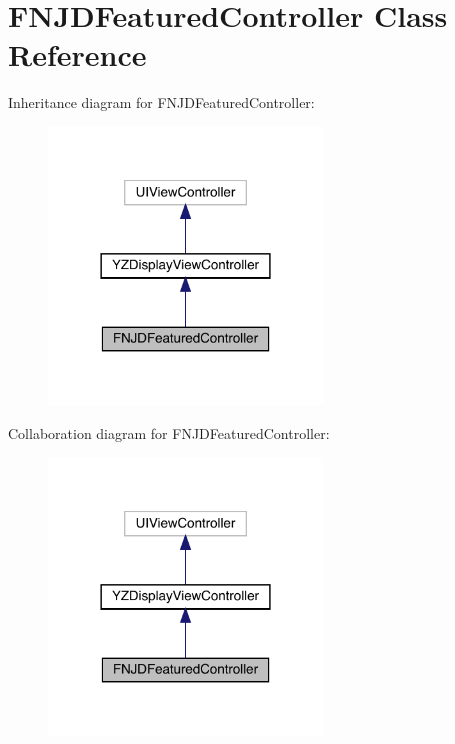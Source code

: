 \hypertarget{interface_f_n_j_d_featured_controller}{}\section{F\+N\+J\+D\+Featured\+Controller Class Reference}
\label{interface_f_n_j_d_featured_controller}


Inheritance diagram for F\+N\+J\+D\+Featured\+Controller\+:\nopagebreak
\begin{figure}[H]
\begin{center}
\leavevmode
\includegraphics[width=206pt]{interface_f_n_j_d_featured_controller__inherit__graph}
\end{center}
\end{figure}


Collaboration diagram for F\+N\+J\+D\+Featured\+Controller\+:\nopagebreak
\begin{figure}[H]
\begin{center}
\leavevmode
\includegraphics[width=206pt]{interface_f_n_j_d_featured_controller__coll__graph}
\end{center}
\end{figure}
